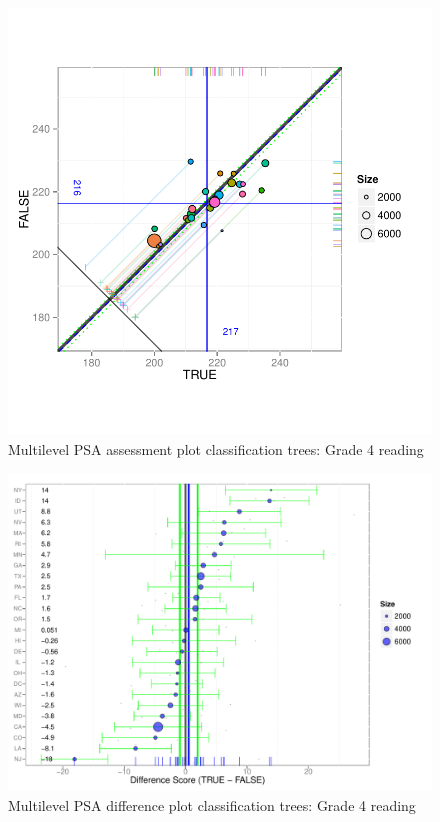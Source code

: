 \begin{figure}[h!]
\begin{center}
\includegraphics[width=\textwidth]{../Figures2009/g4read-mlpsa-ctree-circ.pdf}
\caption{Multilevel PSA assessment plot classification trees: Grade 4 reading}
\end{center}
\end{figure}

\begin{figure}[h!]
\begin{center}
\includegraphics[width=\textwidth]{../Figures2009/g4read-mlpsa-ctree-diff.pdf}
\caption{Multilevel PSA difference plot classification trees: Grade 4 reading}
\end{center}
\label{fig:g4read-mlpsa-ctree-diff}
\end{figure}

